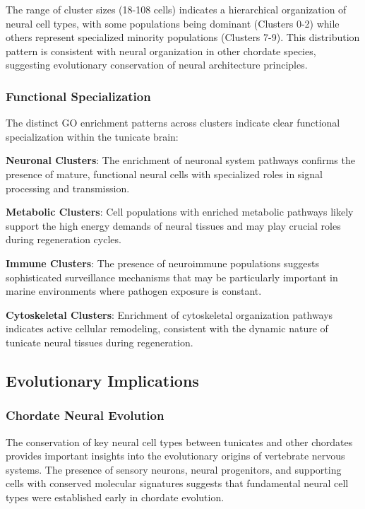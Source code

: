 \documentclass[12pt,a4paper]{article}
\begin{document}
The range of cluster sizes (18-108 cells) indicates a hierarchical organization of neural cell types, with some populations being dominant (Clusters 0-2) while others represent specialized minority populations (Clusters 7-9). This distribution pattern is consistent with neural organization in other chordate species, suggesting evolutionary conservation of neural architecture principles.

\subsubsection{Functional Specialization}
The distinct GO enrichment patterns across clusters indicate clear functional specialization within the tunicate brain:

\textbf{Neuronal Clusters}: The enrichment of neuronal system pathways confirms the presence of mature, functional neural cells with specialized roles in signal processing and transmission.

\textbf{Metabolic Clusters}: Cell populations with enriched metabolic pathways likely support the high energy demands of neural tissues and may play crucial roles during regeneration cycles.

\textbf{Immune Clusters}: The presence of neuroimmune populations suggests sophisticated surveillance mechanisms that may be particularly important in marine environments where pathogen exposure is constant.

\textbf{Cytoskeletal Clusters}: Enrichment of cytoskeletal organization pathways indicates active cellular remodeling, consistent with the dynamic nature of tunicate neural tissues during regeneration.

\subsection{Evolutionary Implications}

\subsubsection{Chordate Neural Evolution}
The conservation of key neural cell types between tunicates and other chordates provides important insights into the evolutionary origins of vertebrate nervous systems. The presence of sensory neurons, neural progenitors, and supporting cells with conserved molecular signatures suggests that fundamental neural cell types were established early in chordate evolution.
\end{document}
